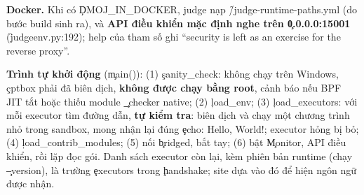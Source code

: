 \textbf{Docker.} Khi có \c{DMOJ_IN_DOCKER}, judge nạp \f{/judge-runtime-paths.yml} (do bước build sinh ra), và \textbf{API điều khiển mặc định nghe trên \c{0.0.0.0:15001}} (\f{judgeenv.py:192}); help của tham số ghi ``security is left as an exercise for the reverse proxy''. \tS

\textbf{Trình tự khởi động} (\c{main()}): (1) \c{sanity_check}: không chạy trên Windows, \c{cptbox} phải đã biên dịch, \textbf{không được chạy bằng root}, cảnh báo nếu BPF JIT tắt hoặc thiếu module \c{_checker} native; (2) \c{load_env}; (3) \c{load_executors}: với mỗi executor tìm đường dẫn, \textbf{tự kiểm tra}: biên dịch và chạy một chương trình nhỏ trong sandbox, mong nhận lại đúng \c{echo: Hello, World!}; executor hỏng bị bỏ; (4) \c{load_contrib_modules}; (5) nối \c{bridged}, bắt tay; (6) bật \c{Monitor}, API điều khiển, rồi lặp đọc gói. Danh sách executor còn lại, kèm phiên bản runtime (chạy \c{--version}), là trường \c{executors} trong \c{handshake}; site dựa vào đó để hiện ngôn ngữ được nhận. \tS

